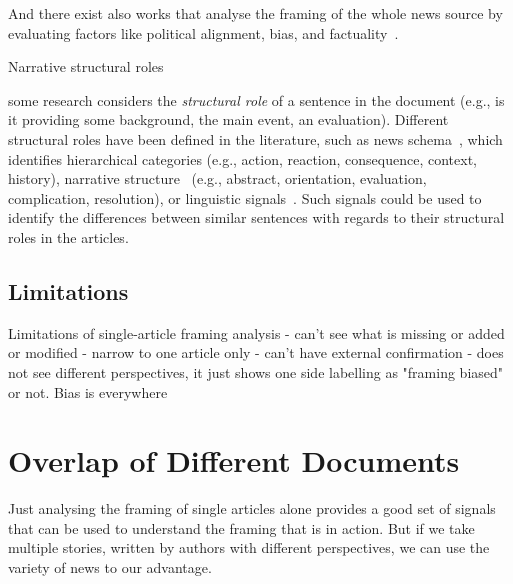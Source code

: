 And there exist also works that analyse the framing of the whole news source by evaluating factors like political alignment, bias, and factuality~\cite{yin2008truth}.


Narrative structural roles
\cite{zahid2019towards}

some research considers the \emph{structural role} of a sentence in the document (e.g., is it providing some background, the main event, an evaluation).
Different structural roles have been defined in the literature, such as 
news schema~\cite{bell1991language}, which identifies hierarchical categories (e.g., action, reaction, consequence, context, history), narrative structure~\cite{bell2005news} (e.g., abstract, orientation, evaluation, complication, resolution), or linguistic signals~\cite{zahid2019towards,marcu2000theory}. 
Such signals could be used to identify the differences between similar sentences with regards to their structural roles in the articles. 

\subsection{Limitations}
\label{ssec:lit_framing_limit}

Limitations of single-article framing analysis
- can't see what is missing or added or modified
- narrow to one article only
- can't have external confirmation
- does not see different perspectives, it just shows one side labelling as "framing biased" or not. Bias is everywhere





\section{Overlap of Different Documents}
\label{sec:lit_relationships}

Just analysing the framing of single articles alone provides a good set of signals that can be used to understand the framing that is in action. But if we take multiple stories, written by authors with different perspectives, we can use the variety of news to our advantage.


